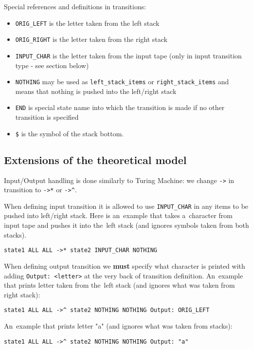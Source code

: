 \documentclass[english,shortabstract,mgr]{iithesis}
\begin{document}
Special references and definitions in transitions:
\begin{itemize}
  \item \texttt{ORIG\_LEFT} is the letter taken from the left stack
  \item \texttt{ORIG\_RIGHT} is the letter taken from the right stack
  \item \texttt{INPUT\_CHAR} is the letter taken from the input tape
      (only in input transition type - see section below)
  \item \texttt{NOTHING} may be used as \texttt{left\_stack\_items} or \texttt{right\_stack\_items}
      and means that nothing is pushed into the left/right stack
  \item \texttt{END} is special state name into which the transition is made if no other transition is specified
  \item \texttt{\$} is the symbol of the stack bottom.
\end{itemize}

\subsection {Extensions of the theoretical model}

Input/Output handling is done similarly to Turing Machine: we change \texttt{->} in transition
to \texttt{->*} or \texttt{->\^}.

When defining input transition it is allowed to use \texttt{INPUT\_CHAR} in any items
to be pushed into left/right stack. Here is an~example that takes a~character from input
tape and pushes it into the~left stack (and ignores symbols taken from both stacks).
\begin{verbatim}
state1 ALL ALL ->* state2 INPUT_CHAR NOTHING
\end{verbatim}

When defining output transition we \textbf{must} specify what character is printed
with adding \texttt{Output: <letter>} at the very back of transition definition.
An~example that prints letter taken from the~left stack (and ignores what was taken from right stack):
\begin{verbatim}
state1 ALL ALL ->^ state2 NOTHING NOTHING Output: ORIG_LEFT
\end{verbatim}
An~example that prints letter "a" (and ignores what was taken from stacks):
\begin{verbatim}
state1 ALL ALL ->^ state2 NOTHING NOTHING Output: "a"
\end{verbatim}
\end{document}
